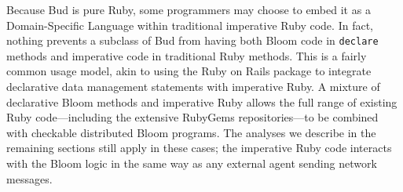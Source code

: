 Because Bud is pure Ruby, some programmers may choose to embed it as a Domain-Specific Language within traditional imperative Ruby code.  In fact, nothing prevents a subclass of Bud from having both Bloom code in \texttt{declare} methods and imperative code in traditional Ruby methods.  This is a fairly common usage model, akin to using the Ruby on Rails package to integrate declarative data management statements with imperative Ruby. A mixture of declarative Bloom methods and imperative Ruby allows the full range of existing Ruby code---including the extensive RubyGems repositories---to be combined with checkable distributed Bloom programs. The analyses we describe in the remaining sections still apply in these cases; the imperative Ruby code interacts with the Bloom logic in the same way as any external agent sending network messages.

